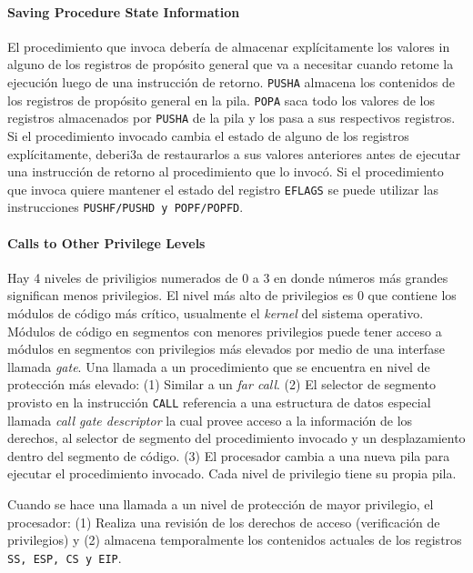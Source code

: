 \paragraph{Saving Procedure State Information}  
El procedimiento que invoca debería de almacenar explícitamente los valores in alguno de los registros de propósito general que va a necesitar cuando retome la ejecución luego de una instrucción de retorno. \texttt{PUSHA} almacena los contenidos de los registros de propósito general en la pila. \texttt{POPA} saca todo los valores de los registros almacenados por \texttt{PUSHA} de la pila y los pasa a sus respectivos registros. Si el procedimiento invocado cambia el estado de alguno de los registros explícitamente, deberi3a de restaurarlos a sus valores anteriores antes de ejecutar una instrucción de retorno al procedimiento que lo invocó.
Si el procedimiento que invoca quiere mantener el estado del registro \texttt{EFLAGS} se puede utilizar las instrucciones \texttt{PUSHF/PUSHD \textnormal{y} POPF/POPFD}.

\paragraph{Calls to Other Privilege Levels}
Hay 4 niveles de priviligios numerados de 0 a 3 en donde números más grandes significan menos privilegios. El nivel más alto de privilegios es 0 que contiene los módulos de código más crítico, usualmente el \textit{kernel} del sistema operativo. Módulos de código en segmentos con menores privilegios puede tener acceso a módulos en segmentos con privilegios más elevados por medio de una interfase llamada \textit{gate}. Una llamada a un procedimiento que se encuentra en nivel de protección más elevado: (1) Similar a un \textit{far call}. (2) El selector de segmento provisto en la instrucción \texttt{CALL} referencia a una estructura de datos especial llamada \textit{call gate descriptor} la cual provee acceso a la información de los derechos, al selector de segmento del procedimiento invocado y un desplazamiento dentro del segmento de código. (3) El procesador cambia a una nueva pila para ejecutar el procedimiento invocado. Cada nivel de privilegio tiene su propia pila.

Cuando se hace una llamada a un nivel de protección de mayor privilegio, el procesador: (1) Realiza una revisión de los derechos de acceso (verificación de privilegios) y (2) almacena temporalmente los contenidos actuales de los registros \texttt{SS, ESP, CS \textnormal{y} EIP}.

